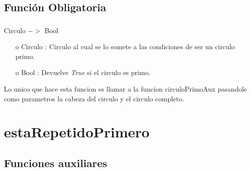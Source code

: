 \documentclass[10pt,journal]{IEEEtran}
\begin{document}
\subsection{Función Obligatoria}
\subsubsection{\color{Red}{esCirculoPrimo}}
\begin{description}[style=nextline]
        \item[\color{Green}{Signatura}]  Circulo $->$ Bool
        \begin{itemize}
        \item [o]  Circulo : Circulo al cual se lo somete a las condiciones de ser un circulo primo.
        \item [o]  Bool : Devuelve \textit{True} si el circulo es primo.
        \end{itemize}        
        
        \item[\color{Green}{Descripción}] Lo unico que hace esta funcion es llamar a la funcion circuloPrimoAux pasandole como parametros la cabeza del circulo y el circulo completo.   
\end{description}

\section{estaRepetidoPrimero}
\subsection{Funciones auxiliares}
\end{document}
